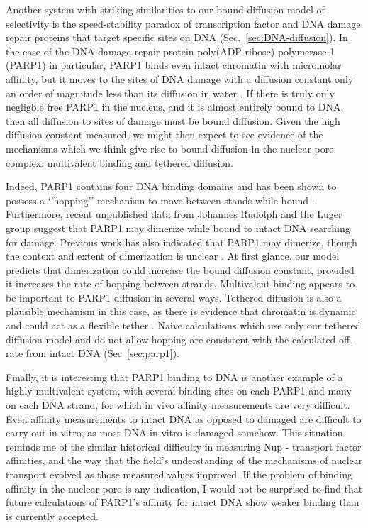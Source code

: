 Another system with striking similarities to our bound-diffusion model of selectivity is the speed-stability paradox of transcription factor and DNA damage repair proteins that target specific sites on DNA (Sec.~\ref{sec:DNA-diffusion}).  In the case of the DNA damage repair protein poly(ADP-ribose) polymerase 1 (PARP1) in particular, PARP1 binds even intact chromatin with micromolar affinity, but it moves to the sites of DNA damage with a diffusion constant only an order of magnitude less than its diffusion in water \cite{rudolph18,mahadevan18}.  If there is truly only negligble free PARP1 in the nucleus, and it is almost entirely bound to DNA, then all diffusion to sites of damage must be bound diffusion.  Given the high diffusion constant measured, we might then expect to see evidence of the mechanisms which we think give rise to bound diffusion in the nuclear pore complex: multivalent binding and tethered diffusion.  

Indeed, PARP1 contains four DNA binding domains and has been shown to possess a `'hopping'' mechanism to move between stands while bound \cite{rudolph18}.  Furthermore, recent unpublished data from Johannes Rudolph and the Luger group suggest that PARP1 may dimerize while bound to intact DNA searching for damage.  Previous work has also indicated that PARP1 may dimerize, though the context and extent of dimerization is unclear \cite{pion05,altmeyer09}.  At first glance, our model predicts that dimerization could increase the bound diffusion constant, provided it increases the rate of hopping between strands.  Multivalent binding appears to be important to PARP1 diffusion in several ways.  Tethered diffusion is also a plausible mechanism in this case, as there is evidence that chromatin is dynamic and could act as a flexible tether \cite{nozaki17,maeshima16}.  Naive calculations which use only our  tethered diffusion model and do not allow hopping are consistent with the calculated off-rate from intact DNA (Sec~\ref{sec:parp1}).  

Finally, it is interesting that PARP1 binding to DNA is another example of a highly multivalent system, with several binding sites on each PARP1 and many on each DNA strand, for which in vivo affinity measurements are very difficult.  Even affinity measurements to intact DNA as opposed to damaged are difficult to carry out in vitro, as most DNA in vitro is damaged somehow.  This situation reminds me of the similar historical difficulty in measuring Nup - transport factor affinities, and the way that the field's understanding of the mechanisms of nuclear transport evolved as those measured values improved.   If the problem of binding affinity in the nuclear pore is any indication, I would not be surprised to find that future calculations of PARP1's affinity for intact DNA show weaker binding than is currently accepted. 

